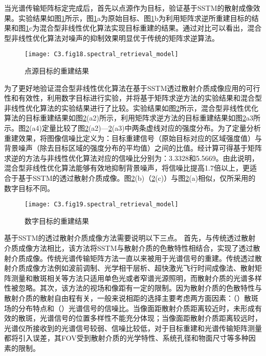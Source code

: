 当光谱传输矩阵标定完成后，首先以点源作为目标，验证基于SSTM的散射成像效果。实验结果如图\ref{fig:3.18}所示，图\ref{fig:3.18}a为原始目标、图\ref{fig:3.18}b为利用矩阵求逆所重建目标的结果和图\ref{fig:3.18}c为混合型非线性优化算法实现目标重建的结果。通过对比可以看出，混合型非线性优化算法对噪声的抑制效果明显优于传统的矩阵求逆算法。
\begin{figure}[htp]
	\centering
	\texttt{[image: C3.fig18.spectral\_retrieval\_model]}
	\caption{点源目标的重建结果}
	\label{fig:3.18}
\end{figure}

为了更好地验证混合型非线性优化算法在基于SSTM透过散射介质成像应用的可行性和有效性，利用数字目标进行实验，并将基于矩阵求逆方法的实验结果和混合型非线性优化算法的实验结果进行了比较。实验结果如图\ref{fig:3.19}所示，混合型非线性优化算法的目标重建结果如图\ref{fig:3.19}(a2)所示，利用矩阵求逆方法的目标重建结果如图\ref{fig:3.19}a3所示。图\ref{fig:3.19}(a4)定量比较了图\ref{fig:3.19}(a2)—\ref{fig:3.19}(a3)中两条虚线对应的强度分布。为了定量分析重建效果，将图像信噪比定义为：目标重建信号（原始目标对应的区域强度值）与背景噪声（除去目标区域的强度分布的平均值）之间的比值。经计算可得基于矩阵求逆的方法与非线性优化算法对应的信噪比分别为：3.3328和5.5669。由此说明，混合型非线性优化算法能够有效地抑制背景噪声，将信噪比提高1.7倍以上，更适合于基于SSTM的透过散射介质成像。图\ref{fig:3.19}(b)（\ref{fig:3.19}(c)）与图\ref{fig:3.19}(a)相似，仅所采用的数字目标不同。

\begin{figure}[htp]
	\centering
	\texttt{[image: C3.fig19.spectral\_retrieval\_model]}
	\caption{数字目标的重建结果}
	\label{fig:3.19}
\end{figure}

基于SSTM的透过散射介质成像方法需要说明以下三点。 首先，与传统透过散射介质成像方法相比，该方法将SSTM与散射介质的色散特性相结合，实现了透过散射介质成像。传统光谱传输矩阵方法一直以来被用于光谱信号的重建。传统透过散射介质成像方法例如波前调制、光学相干层析、超快激光飞行时间成像法、散射矩阵测量和散斑相关等方法只适用单色光或者窄谱光源照明，而散射介质的光谱多样性被忽略。其次，该方法的视场和像距有一定的限制。因为散射介质的色散特性与散射介质的散射自由程有关，一般来说相距的选择主要考虑两方面因素：（）散斑场的分布特点和（）光谱信号的信噪比。当像面距散射介质距离较近时，未形成有效的散斑，光谱信号的位置多样性不能充分体现；当像面距散射介质距离较远时，光谱仪所接收到的光谱信号较弱、信噪比较低，对于目标重建和光谱传输矩阵测量都将引入误差，其FOV受到散射介质的光学特性、系统孔径和物面尺寸等多种因素的限制。

